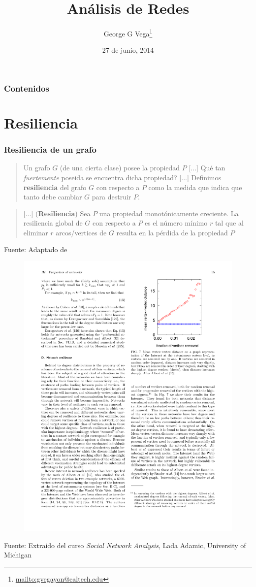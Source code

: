 \documentclass[10pt,handout]{beamer}
\author{George G Vega\thanks{\url{mailto:gvegayon@caltech.edu}}}
\institute{Superintendencia de Pensiones}
\title{An\'alisis de Redes}
\date{27 de junio, 2014}
\begin{document}
\frame{\maketitle}

\begin{frame}
\frametitle{Contenidos}
\tableofcontents
\end{frame}


\section{Resiliencia}

\begin{frame}
\frametitle{Resiliencia de un grafo}

\begin{quote}
Un grafo $G$ (de una cierta clase) posee la propiedad $P$ [...] Qu\'e tan 
\emph{fuertemente} poseida se encuentra dicha propiedad? [...] Definimos
{\bf resiliencia} del grafo $G$ con respecto a $P$ como la medida que indica
que tanto debe cambiar $G$ para destruir $P$.
\end{quote} 

\begin{quote}
[...] ({\bf Resiliencia}) Sea $P$ una propiedad 
monot\'onicamente creciente. La resiliencia global de $G$ con respecto a $P$ es
el n\'umero m\'inimo $r$ tal que al eliminar $r$ arcos/vertices de $G$ resulta
en la p\'erdida de la propiedad $P$
\end{quote}
{\footnotesize Fuente: Adaptado de \cite{sudakov2008local}}
\end{frame}

\begin{frame}
\begin{figure}
\includegraphics[trim=11cm 16cm 1.5cm 1.5cm, clip=true, width=.6\linewidth]{newman_network_resilense.pdf}
\end{figure}
{\footnotesize Fuente: Extraido del curso \emph{Social Network Analysis}, Lada
Adamic, University of Michigan \cite{lada2014}}
\end{frame}
\end{document}
